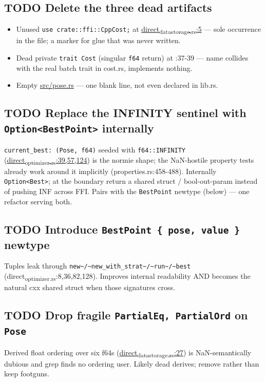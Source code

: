 \documentclass[11pt]{article}
\begin{document}
\subsection{{\bfseries\sffamily TODO} Delete the three dead artifacts}
\label{sec:orgbc5d717}
\begin{itemize}
\item Unused \texttt{use crate::ffi::CppCost;} at
\href{rust/direct-rs/src/direct\_data\_storage.rs}{direct\textsubscript{data}\textsubscript{storage.rs}:5} — sole occurrence in the file; a marker
for glue that was never written.
\item Dead private \texttt{trait Cost} (singular \texttt{f64} return) at :37-39 — name
collides with the real batch trait in cost.rs, implements nothing.
\item Empty \href{rust/direct-rs/src/pose.rs}{src/pose.rs} — one blank line, not even declared in lib.rs.
\end{itemize}
\subsection{{\bfseries\sffamily TODO} Replace the INFINITY sentinel with \texttt{Option<BestPoint>} internally}
\label{sec:org1ad4446}
\texttt{current\_best: (Pose, f64)} seeded with \texttt{f64::INFINITY}
(\href{rust/direct-rs/src/direct\_optimizer.rs}{direct\textsubscript{optimizer.rs}:39,57,124}) is the normie shape; the NaN-hostile
property tests already work around it implicitly (properties.rs:458-488).
Internally \texttt{Option<Best>}; at the boundary return a shared struct /
bool-out-param instead of pushing INF across FFI. Pairs with the
\texttt{BestPoint} newtype (below) — one refactor serving both.
\subsection{{\bfseries\sffamily TODO} Introduce \texttt{BestPoint \{ pose, value \}} newtype}
\label{sec:orgfa8838e}
Tuples leak through \texttt{new\textasciitilde{}/\textasciitilde{}new\_with\_strat\textasciitilde{}/\textasciitilde{}run\textasciitilde{}/\textasciitilde{}best}
(direct\textsubscript{optimizer.rs}:8,36,82,128). Improves internal readability AND
becomes the natural cxx shared struct when those signatures cross.
\subsection{{\bfseries\sffamily TODO} Drop fragile \texttt{PartialEq, PartialOrd} on \texttt{Pose}}
\label{sec:org7578233}
Derived float ordering over six f64s (\href{rust/direct-rs/src/direct\_data\_storage.rs}{direct\textsubscript{data}\textsubscript{storage.rs}:27}) is NaN-semantically
dubious and grep finds no ordering user. Likely dead derives; remove rather than keep
footguns.
\end{document}
